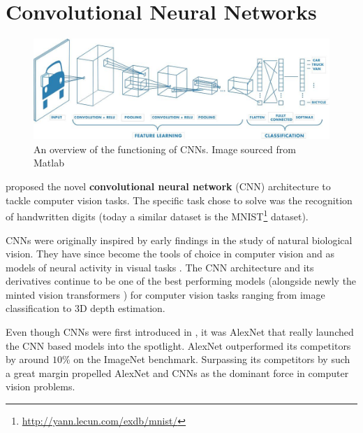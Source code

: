 
\usetikzlibrary{calc,shapes,positioning}

\chapter{Convolutional Neural Networks}\label{chap:cnn}


\begin{figure}[ht]
    \captionsetup{justification=centering}
    \centering
    \includegraphics[width=\textwidth]{chapters/assets/cnn.jpg}
    \caption{An overview of the functioning of CNNs. Image sourced from Matlab\protect\footnotemark}
    \label{fig:cnn-overview}
\end{figure}
\citeauthor{LeCun1989} proposed the novel \textbf{convolutional neural network} (CNN) architecture to tackle computer vision tasks. The specific task \citeauthor{LeCun1989} chose to solve was the recognition of handwritten digits (today a similar dataset is the MNIST\footnote{\url{http://yann.lecun.com/exdb/mnist/}} dataset). 


CNNs were originally inspired by early findings in the study of natural biological vision. They have since become the tools of choice in computer vision and as models of neural activity in visual tasks \parencite{Kuzovkin2018, Lindsay2021, Eickenberg2017}. The CNN architecture and its derivatives continue to be one of the best performing models (alongside newly the minted vision transformers \parencite{Dosovitskiy2020}) for computer vision tasks ranging from image classification to 3D depth estimation.

Even though CNNs were first introduced in \citeyear{LeCun1989}, it was AlexNet \parencite{AlexNet2012} that really launched the CNN based models into the spotlight. AlexNet outperformed its competitors by around $10\%$ on the ImageNet \parencite{deng2009imagenet} benchmark. Surpassing its competitors by such a great margin propelled AlexNet and CNNs as the dominant force in computer vision problems.


